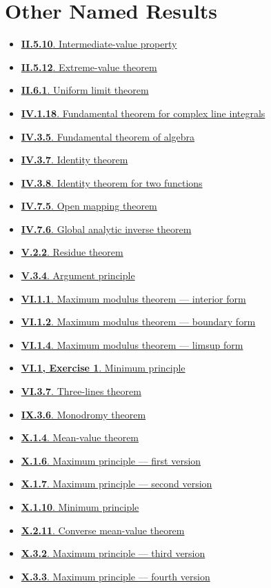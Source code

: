 \documentclass[11pt,a4paper,openany]{book}
\theoremstyle{studyplain}
\theoremstyle{studydefinition}
\theoremstyle{studyremark}
\newcommand{\NamedIndexItem}[3]{%
  \item \hyperref[#1]{\textbf{#2}. #3}%
}
\begin{document}
\section{Other Named Results}
\begin{multicols}{2}
\raggedcolumns
\raggedright
\begin{itemize}[leftmargin=*,itemsep=0.35em,topsep=0.2em]
\NamedIndexItem{result-ii-5-10-intermediate-value-property}{II.5.10}{Intermediate-value property}
\NamedIndexItem{result-ii-5-12-extreme-value-theorem}{II.5.12}{Extreme-value theorem}
\NamedIndexItem{result-ii-6-1-uniform-limit-theorem}{II.6.1}{Uniform limit theorem}
\NamedIndexItem{result-iv-1-18-fundamental-theorem-for-complex-line-integrals}{IV.1.18}{Fundamental theorem for complex line integrals}
\NamedIndexItem{result-iv-3-5-fundamental-theorem-of-algebra}{IV.3.5}{Fundamental theorem of algebra}
\NamedIndexItem{result-iv-3-7-identity-theorem}{IV.3.7}{Identity theorem}
\NamedIndexItem{result-iv-3-8-identity-theorem-for-two-functions}{IV.3.8}{Identity theorem for two functions}
\NamedIndexItem{result-iv-7-5-open-mapping-theorem}{IV.7.5}{Open mapping theorem}
\NamedIndexItem{result-iv-7-6-global-analytic-inverse-theorem}{IV.7.6}{Global analytic inverse theorem}
\NamedIndexItem{result-v-2-2-residue-theorem}{V.2.2}{Residue theorem}
\NamedIndexItem{result-v-3-4-argument-principle}{V.3.4}{Argument principle}
\NamedIndexItem{result-vi-1-1-maximum-modulus-theorem-interior-form}{VI.1.1}{Maximum modulus theorem — interior form}
\NamedIndexItem{result-vi-1-2-maximum-modulus-theorem-boundary-form}{VI.1.2}{Maximum modulus theorem — boundary form}
\NamedIndexItem{result-vi-1-4-maximum-modulus-theorem-limsup-form}{VI.1.4}{Maximum modulus theorem — limsup form}
\NamedIndexItem{result-vi-1-exercise-1-minimum-principle}{VI.1, Exercise 1}{Minimum principle}
\NamedIndexItem{result-vi-3-7-three-lines-theorem}{VI.3.7}{Three-lines theorem}
\NamedIndexItem{result-ix-3-6-monodromy-theorem}{IX.3.6}{Monodromy theorem}
\NamedIndexItem{result-x-1-4-mean-value-theorem}{X.1.4}{Mean-value theorem}
\NamedIndexItem{result-x-1-6-maximum-principle-first-version}{X.1.6}{Maximum principle — first version}
\NamedIndexItem{result-x-1-7-maximum-principle-second-version}{X.1.7}{Maximum principle — second version}
\NamedIndexItem{result-x-1-10-minimum-principle}{X.1.10}{Minimum principle}
\NamedIndexItem{result-x-2-11-converse-mean-value-theorem}{X.2.11}{Converse mean-value theorem}
\NamedIndexItem{result-x-3-2-maximum-principle-third-version}{X.3.2}{Maximum principle — third version}
\NamedIndexItem{result-x-3-3-maximum-principle-fourth-version}{X.3.3}{Maximum principle — fourth version}
\end{itemize}
\end{multicols}

\printindex[results]
\printindex[subjects]
\end{document}

